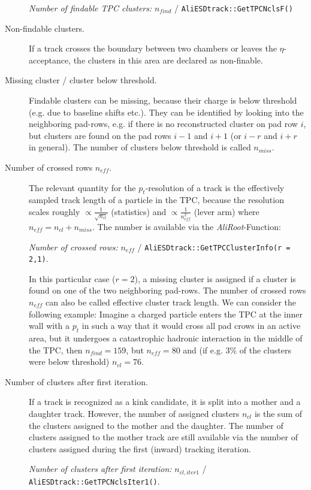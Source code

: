 \documentclass[12pt]{article}
\begin{document}
\begin{description}
\medskip	
	{\it Number of findable TPC clusters:} $n_{find}$ / {\tt AliESDtrack::GetTPCNclsF() }
\medskip
	
	\item[Non-findable clusters.] If a track crosses the boundary between two chambers or leaves the $\eta$-acceptance, the clusters in this area are declared as non-finable.
	
	\item[Missing cluster / cluster below threshold.] Findable clusters can be missing, because their charge is below threshold (e.g. due to baseline shifts etc.). They can be identified by looking into the neighboring pad-rows, e.g. if there is no reconstructed cluster on pad row $i$, but clusters are found on the pad rows $i-1$ and $i+1$ (or $i-r$ and $i+r$ in general). The number of clusters below threshold is called $n_{miss}$.
		
        \item[Number of crossed rows $n_{eff}$.] The relevant quantity for the $p_{t}$-resolution of a track is the effectively sampled track length of a particle in the TPC, because the resolution scales roughly $\propto \frac{1}{\sqrt{n_{cl}}}$ (statistics) and  $\propto \frac{1}{n_{eff}^{2}}$ (lever arm) where $n_{eff} = n_{cl} + n_{miss}$. The number is available via the {\it AliRoot}-Function:
	
\medskip
	{\it Number of crossed rows:} $n_{eff}$ / {\tt AliESDtrack::GetTPCClusterInfo(r = 2,1)}.
\medskip

	In this particular case ($r = 2$), a missing cluster is assigned if a cluster is found on one of the two neighboring pad-rows. The number of crossed rows $n_{eff}$ can also be called effective cluster track length. We can consider the following example: Imagine a charged particle enters the TPC at the inner wall with a $p_{t}$ in such a way that it would cross all pad crows in an active area, but it undergoes a catastrophic hadronic interaction in the middle of the TPC, then $n_{find} = 159$, but $n_{eff} = 80$ and (if e.g. 3\% of the clusters were below threshold) $n_{cl} = 76$.
	
	\item[Number of clusters after first iteration.] If a track is recognized as a kink candidate, it is split into a mother and a daughter track. However, the number of assigned clusters $n_{cl}$ is the sum of the clusters assigned to the mother and the daughter. The number of clusters assigned to the mother track are still available via the number of clusters assigned during the first (inward) tracking iteration.
	
\medskip
	{\it Number of clusters after first iteration:} $n_{cl,iter1}$ / {\tt AliESDtrack::GetTPCNclsIter1()}.
\medskip

		
	\end{description}
\end{document}
